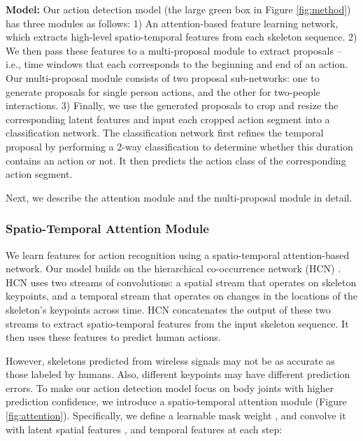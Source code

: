 \documentclass[10pt,twocolumn,letterpaper]{article}
\begin{document}
\noindent\textbf{Model:} Our action detection model (the large green box in Figure \ref{fig:method}) has three modules as follows:
1) An attention-based feature learning network, which extracts high-level spatio-temporal features from each skeleton sequence. 
2) We then pass these features to a multi-proposal module to extract proposals -- i.e., time windows that each corresponds to the beginning and end of an action.  Our multi-proposal module consists of two proposal sub-networks: one to generate proposals for single person actions, and the other for two-people interactions.
3) Finally, we use the generated proposals to crop and resize the corresponding latent features and input each cropped action segment into a classification network. The classification network first refines the temporal proposal by performing a 2-way classification to determine whether this duration contains an action or not. It then predicts the action class of the corresponding action segment.

Next, we describe the attention module and the multi-proposal module in detail. 


\subsubsection{Spatio-Temporal Attention Module}\label{sec:attention}
We learn features for action recognition using a spatio-temporal attention-based network. 
Our model builds on the hierarchical co-occurrence network (HCN) \cite{zhu2016co}. HCN uses two streams of convolutions:
a spatial stream that operates on skeleton keypoints, and a temporal stream that operates on changes in the locations of the skeleton's keypoints across time.  HCN concatenates the output of these two streams to extract spatio-temporal features from the input skeleton sequence. It then uses these features to predict human actions.   

However, skeletons predicted from wireless signals may not be as accurate as those labeled by humans. Also, different keypoints may have different prediction errors. To make our action detection model focus on body joints with higher prediction confidence, we introduce a spatio-temporal attention module (Figure \ref{fig:attention}). Specifically, we define a learnable mask weight , and convolve it with latent spatial features , and temporal features  at each step:
 
\end{document}

